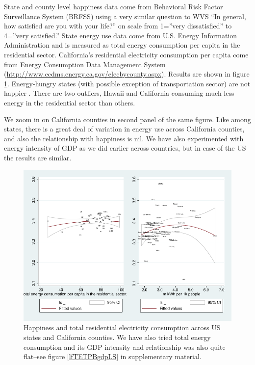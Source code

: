 \documentclass[10pt, letterpaper]{article}
\begin{document}
\begin{spacing}{1.4}
State and county level happiness data come from Behavioral Risk Factor
Surveillance System (BRFSS) using a very similar question to WVS ``In general,
how satisfied are you with your life?'' on scale 
from 1=''very dissatisfied'' to 4=''very satisfied.'' State energy use data come from
U.S. Energy Information Administration and is measured as  total energy
consumption per capita in the residential sector.  
California's  residential electricity consumption per capita come from 
Energy Consumption Data Management System
(\url{http://www.ecdms.energy.ca.gov/elecbycounty.aspx}). Results are shown in
figure \ref{stateCaPAP}. Energy-hungry states (with possible exception of transportation sector) are not happier%
. There are two outliers, Hawaii and California consuming much less energy in
the residential sector than others. 

We zoom in on California counties in
second panel of the same figure. Like among states, there is a great deal of variation in energy
use across California counties, and also the 
relationship with happiness is nil. 
We have also experimented with energy intensity of
GDP as we did earlier across countries, but in case of the US the results are
similar. %

\begin{figure}[H]
 \includegraphics[width=6in]{graphsAndTables/stateCa.pdf}\centering
\caption{Happiness and total residential electricity consumption across US states and  
  California counties.  %
We have also tried total energy consumption and its GDP
  intensity and relationship was also quite flat--see figure \ref{lfTETPBgdpLS}
  in supplementary material.}\label{stateCaPAP}
 \end{figure} %


\end{spacing}
\end{document}
